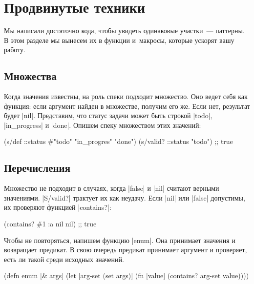 \section{Продвинутые техники}


Мы написали достаточно кода, чтобы увидеть одинаковые участки~--- паттерны. В
этом разделе мы вынесем их в функции и~макросы, которые ускорят вашу работу.

\subsection{Множества}


Когда значения известны, на роль спеки подходит множество. Оно ведет себя как
функция: если аргумент найден в множестве, получим его же. Если нет, результат
будет \spverb|nil|. Представим, что статус задачи может быть строкой
\spverb|todo|, \spverb|in_progress| и \spverb|done|. Опишем спеку множеством
этих значений:

\begin{english}
  \begin{clojure}
(s/def ::status #{"todo" "in_progres" "done"})
(s/valid? ::status "todo") ;; true
  \end{clojure}
\end{english}

\subsection{Перечисления}


Множество не подходит в случаях, когда \spverb|false| и \spverb|nil| считают
верными значениями. \spverb|S/valid?| трактует их как неудачу. Если \spverb|nil|
или \spverb|false| допустимы, их проверяют функцией \spverb|contains?|:

\begin{english}
  \begin{clojure}
(contains? #{1 :a nil} nil) ;; true
  \end{clojure}
\end{english}

Чтобы не повторяться, напишем функцию \spverb|enum|. Она принимает значения и
возвращает предикат. В свою очередь предикат принимает аргумент и проверяет,
есть ли такой среди исходных значений.

\begin{english}
  \begin{clojure}
(defn enum [& args]
  (let [arg-set (set args)]
    (fn [value]
      (contains? arg-set value))))
  \end{clojure}
\end{english}


